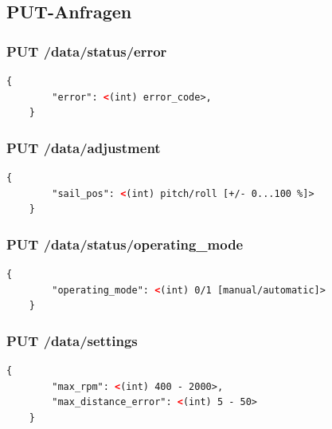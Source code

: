 \subsection{PUT-Anfragen}
\subsubsection{PUT /data/status/error}
\begin{lstlisting}[language=XML, caption={PUT-Request 1}]
	{
		"error": <(int) error_code>,
	}
\end{lstlisting}
\newpage
\subsubsection{PUT /data/adjustment}
\begin{lstlisting}[language=XML, caption={PUT-Request 2}]
	{
		"sail_pos": <(int) pitch/roll [+/- 0...100 %]>
	}
\end{lstlisting}
\subsubsection{PUT /data/status/operating\_mode}
\begin{lstlisting}[language=XML, caption={PUT-Request 3}]
	{
		"operating_mode": <(int) 0/1 [manual/automatic]>
	}
\end{lstlisting}
\subsubsection{PUT /data/settings}
\begin{lstlisting}[language=XML, caption={PUT-Request 4}]
	{
		"max_rpm": <(int) 400 - 2000>,
		"max_distance_error": <(int) 5 - 50>
	}
\end{lstlisting}